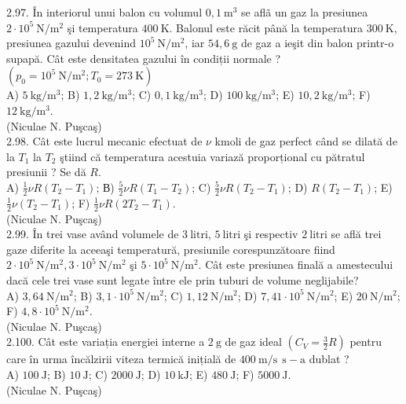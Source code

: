 2.97. În interiorul unui balon cu volumul $0,1 \mathrm{~m}^{3}$ se aflã un gaz la presiunea $2 \cdot 10^{5} \mathrm{~N} / \mathrm{m}^{2}$ şi temperatura $400 \mathrm{~K}$. Balonul este răcit până la temperatura $300 \mathrm{~K}$, presiunea gazului devenind $10^{5} \mathrm{~N} / \mathrm{m}^{2}$, iar $54,6 \mathrm{~g}$ de gaz a ieşit din balon printr-o supapă. Cât este densitatea gazului în condiții normale ? $\left(p_{0}=10^{5} \mathrm{~N} / \mathrm{m}^{2} ; T_{0}=273 \mathrm{~K}\right)$\\ A) $5 \mathrm{~kg} / \mathrm{m}^{3}$; B) $1,2 \mathrm{~kg} / \mathrm{m}^{3}$; C) $0,1 \mathrm{~kg} / \mathrm{m}^{3}$; D) $100 \mathrm{~kg} / \mathrm{m}^{3}$; E) $10,2 \mathrm{~kg} / \mathrm{m}^{3}$; F) $12 \mathrm{~kg} / \mathrm{m}^{3}$.\\ (Niculae N. Puşcaş)\\

2.98. Cât este lucrul mecanic efectuat de $\nu$ kmoli de gaz perfect când se dilată de la $T_{1}$ la $T_{2}$ ştiind că temperatura acestuia variază proporțional cu pătratul presiunii ? Se dă $R$.\\ A) $\frac{1}{2} \nu R\left(T_{2}-T_{1}\right)$; В) $\frac{5}{2} \nu R\left(T_{1}-T_{2}\right)$; C) $\frac{5}{2} \nu R\left(T_{2}-T_{1}\right)$; D) $R\left(T_{2}-T_{1}\right)$; E) $\frac{1}{2} \nu\left(T_{2}-T_{1}\right)$; F) $\frac{1}{2} \nu R\left(2 T_{2}-T_{1}\right)$.\\ (Niculae N. Puşcaş)\\

2.99. În trei vase având volumele de $3 \mathrm{~litri}$, $5 \mathrm{~litri}$ şi respectiv $2 \mathrm{~litri}$ se află trei gaze diferite la aceeaşi temperatură, presiunile corespunzătoare fiind $2 \cdot 10^{5} \mathrm{~N} / \mathrm{m}^{2}, 3 \cdot 10^{5} \mathrm{~N} / \mathrm{m}^{2}$ şi $5 \cdot 10^{5} \mathrm{~N} / \mathrm{m}^{2}$. Cât este presiunea finală a amestecului dacă cele trei vase sunt legate între ele prin tuburi de volume neglijabile?\\ A) $3,64 \mathrm{~N} / \mathrm{m}^{2}$; B) $3,1 \cdot 10^{5} \mathrm{~N} / \mathrm{m}^{2}$; C) $1,12 \mathrm{~N} / \mathrm{m}^{2}$; D) $7,41 \cdot 10^{5} \mathrm{~N} / \mathrm{m}^{2}$; E) $20 \mathrm{~N} / \mathrm{m}^{2}$; F) $4,8 \cdot 10^{5} \mathrm{~N} / \mathrm{m}^{2}$.\\ (Niculae N. Puşcaş)\\

2.100. Cât este variația energiei interne a $2 \mathrm{~g}$ de gaz ideal $\left(C_{V}=\frac{3}{2} R\right)$ pentru care în urma încălzirii viteza termică inițială de $400 \mathrm{~m} / \mathrm{s} ~ \mathrm{~s}-\mathrm{a}$ dublat ?\\ A) $100 \mathrm{~J}$; B) $10 \mathrm{~J}$; C) $2000 \mathrm{~J}$; D) $10 \mathrm{~kJ}$; E) $480 \mathrm{~J}$; F) $5000 \mathrm{~J}$.\\ (Niculae N. Puşcaş)\\

